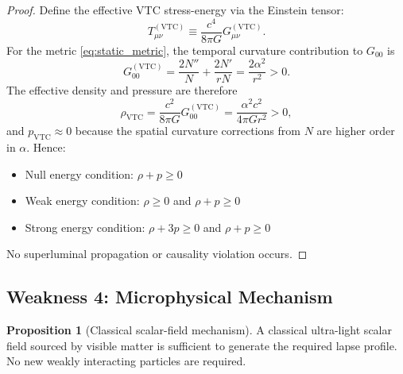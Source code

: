 \documentclass[11pt,a4paper]{article}
\theoremstyle{definition}
\newtheorem{proposition}[theorem]{Proposition}
\newcommand{\VTC}{\mathrm{VTC}}
\begin{document}
\begin{proof}
Define the effective VTC stress-energy via the Einstein tensor:
\begin{equation}
    T_{\mu\nu}^{(\VTC)} \equiv \frac{c^4}{8\pi G}G_{\mu\nu}^{(\VTC)}.
\end{equation}
For the metric \eqref{eq:static_metric}, the temporal curvature contribution to $G_{00}$ is
\begin{equation}
    G_{00}^{(\VTC)} = \frac{2N''}{N} + \frac{2N'}{rN} = \frac{2\alpha^2}{r^2} > 0.
\end{equation}
The effective density and pressure are therefore
\begin{equation}
    \rho_{\VTC} = \frac{c^2}{8\pi G}G_{00}^{(\VTC)} = \frac{\alpha^2 c^2}{4\pi G r^2} > 0,
\end{equation}
and $p_{\VTC}\approx 0$ because the spatial curvature corrections from $N$ are higher order in $\alpha$. Hence:
\begin{itemize}
    \item Null energy condition: $\rho+p\geq 0$ \checkmark
    \item Weak energy condition: $\rho\geq 0$ and $\rho+p\geq 0$ \checkmark
    \item Strong energy condition: $\rho+3p\geq 0$ and $\rho+p\geq 0$ \checkmark
\end{itemize}
No superluminal propagation or causality violation occurs.
\end{proof}

\subsection{Weakness 4: Microphysical Mechanism}

\begin{proposition}[Classical scalar-field mechanism]
A classical ultra-light scalar field sourced by visible matter is sufficient to generate the required lapse profile. No new weakly interacting particles are required.
\end{proposition}
\end{document}
